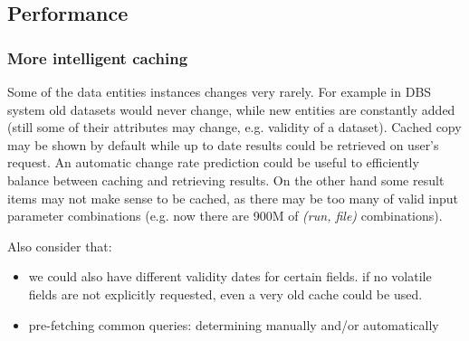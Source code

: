 \subsection{Performance}



\subsubsection*{More intelligent caching}
Some of the data entities instances changes very rarely. For example in DBS system old datasets would never change, while new entities are constantly added (still some of their attributes may change, e.g.  validity of a dataset). 
%
Cached copy may be shown by default while up to date results could be retrieved on user's request. An automatic change rate prediction could be useful to efficiently balance between caching and retrieving results.
%
On the other hand some result items may not make sense to be cached, as there may be too many of valid input parameter combinations (e.g. now there are 900M of \textit{(run, file)} combinations).

Also consider that:
                			\begin{itemize}
                			\item we could also have different validity dates for certain fields. if no volatile fields are not explicitly requested, even a very old cache could be used. 
                			\item pre-fetching common queries: determining manually and/or automatically
                			\end{itemize}






